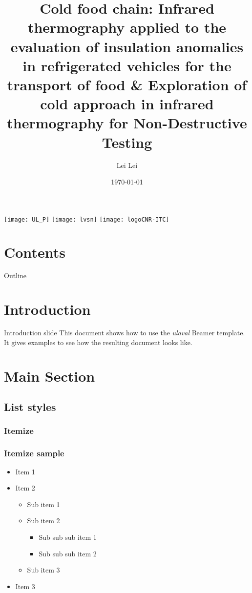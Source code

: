 \documentclass{beamer}
\title[Cold food chain-IRT application]{Cold food chain: Infrared thermography applied to the evaluation of insulation anomalies in refrigerated vehicles for the transport of food \& Exploration of cold approach in infrared thermography for Non-Destructive Testing}
\author[Lei Lei]{Lei Lei}
\institute[Université Laval]
{
	Electrical and Computer Engineering Department \\
	Laval University, Quebec City, Canada \\
	\medskip
}
\date{\today} %
\begin{document}
\begin{frame}[label=titre, plain]
	\titlepage
	\begin{center}
		\texttt{[image: UL\_P]}%
		\hspace{1cm}
		\texttt{[image: lvsn]}
		\hspace{1cm}
		\texttt{[image: logoCNR-ITC]}
	\end{center}
\end{frame}


\section*{Contents}

\begin{frame}[label=toc]{Outline}
	\setlength{\leftskip}{5cm}%
	\tableofcontents[subsectionstyle=show]
\end{frame}


\section{Introduction}


\begin{frame}[label=intro]{Introduction slide}
	This document shows how to use the \emph{ulaval} Beamer template.
	It gives examples to see how the resulting document looks like.
\end{frame}

\section{Main Section}

\subsection{List styles}

\subsubsection{Itemize}

\begin{frame}[label=itemize]\frametitle{Itemize sample} 
	\begin{itemize}
		\item Item 1
		\item Item 2
		\begin{itemize}
			\item Sub item 1
			\item Sub item 2
			\begin{itemize}
				\item Sub sub sub item 1
				\item Sub sub sub item 2
			\end{itemize}
			\item Sub item 3
		\end{itemize}
		\item Item 3
	\end{itemize}
\end{frame}
\end{document}
